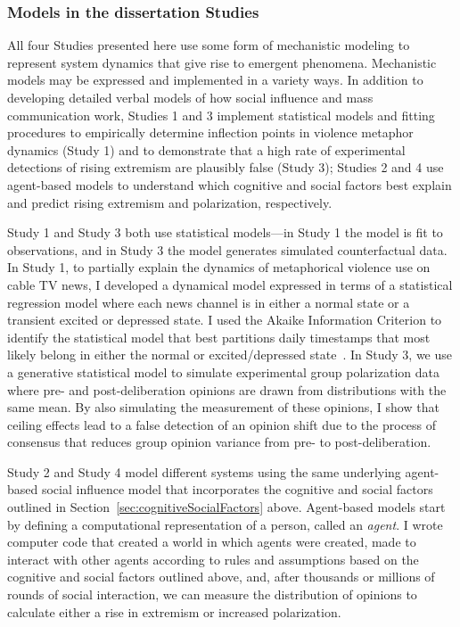 \documentclass[12pt,letterpaper]{article}
\begin{document}
\subsubsection{Models in the dissertation Studies}

All four Studies presented here use some form of mechanistic modeling to 
represent system dynamics that give rise to emergent phenomena. Mechanistic
models may be expressed and implemented in a variety ways. In addition to 
developing detailed verbal models of how social influence and mass
communication work, Studies 1 and 3 implement statistical models and 
fitting procedures to empirically
determine inflection points in violence metaphor dynamics (Study 1) and 
to demonstrate that a high rate of experimental detections of rising extremism
are plausibly false (Study 3); Studies 2 and 4 use 
agent-based models to understand which cognitive and social factors best explain
and predict rising extremism and polarization, respectively.

Study 1 and Study 3 both use statistical models---in Study 1 the model is fit
to observations, and in Study 3 the model generates simulated counterfactual
data. In Study 1, to partially explain the dynamics of metaphorical violence use on cable TV news,
I developed a dynamical model expressed in terms of a statistical regression
model where each news channel is in either a normal state or a 
transient excited or depressed state. I used the Akaike Information 
Criterion to identify the statistical model
that best partitions daily timestamps that most likely belong in either the
normal or excited/depressed state~\cite{Burnham2004,Burnham2011}. 
In Study 3, we use a generative 
statistical model to simulate experimental group polarization data where
pre- and post-deliberation opinions are drawn from distributions with the
same mean. By also simulating the measurement of these opinions, I show
that ceiling effects lead to a false detection of an opinion shift due to
the process of consensus that reduces group opinion variance from
pre- to post-deliberation.

Study 2 and Study 4 model different systems using the same underlying
agent-based social influence model that incorporates the cognitive and social 
factors outlined in Section~\ref{sec:cognitiveSocialFactors} above. Agent-based
models start by defining a computational representation of a person, called
an \emph{agent}. I wrote computer code that created a world in which agents
were created, made to interact with other agents according to rules and
assumptions based on the cognitive and social factors outlined above, and, 
after thousands or millions of rounds of social interaction, we can measure
the distribution of opinions to calculate either a rise in extremism or
increased polarization.
     
\end{document}
